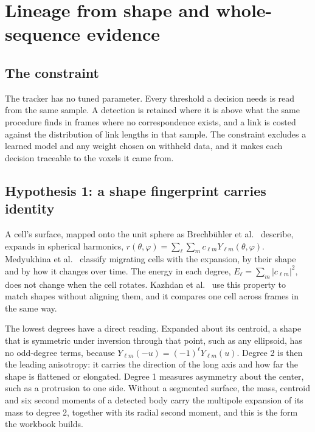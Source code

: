 \chapter{\texorpdfstring{Lineage from shape and whole-sequence evidence}{Lineage from shape and whole-sequence evidence}}
\label{chap:proposal}

\section{\texorpdfstring{The constraint}{The constraint}}

The tracker has no tuned parameter. Every threshold a decision needs is read from the same sample. A detection is retained where it is above what the same procedure finds in frames where no correspondence exists, and a link is costed against the distribution of link lengths in that sample. The constraint excludes a learned model and any weight chosen on withheld data, and it makes each decision traceable to the voxels it came from.

\section{\texorpdfstring{Hypothesis 1: a shape fingerprint carries identity}{Hypothesis 1: a shape fingerprint carries identity}}

A cell's surface, mapped onto the unit sphere as Brechbühler et al.~\cite{src:Brechbuhler-1995} describe, expands in spherical harmonics, \(r(\theta, \varphi) = \sum_{\ell} \sum_{m} c_{\ell m} Y_{\ell m}(\theta, \varphi)\). Medyukhina et al.~\cite{src:Medyukhina-2020} classify migrating cells with the expansion, by their shape and by how it changes over time. The energy in each degree, \(E_\ell = \sum_m |c_{\ell m}|^2\), does not change when the cell rotates. Kazhdan et al.~\cite{src:Kazhdan-2003} use this property to match shapes without aligning them, and it compares one cell across frames in the same way.

The lowest degrees have a direct reading. Expanded about its centroid, a shape that is symmetric under inversion through that point, such as any ellipsoid, has no odd-degree terms, because \(Y_{\ell m}(-u) = (-1)^\ell Y_{\ell m}(u)\). Degree 2 is then the leading anisotropy: it carries the direction of the long axis and how far the shape is flattened or elongated. Degree 1 measures asymmetry about the center, such as a protrusion to one side. Without a segmented surface, the mass, centroid and six second moments of a detected body carry the multipole expansion of its mass to degree 2, together with its radial second moment, and this is the form the workbook builds.


